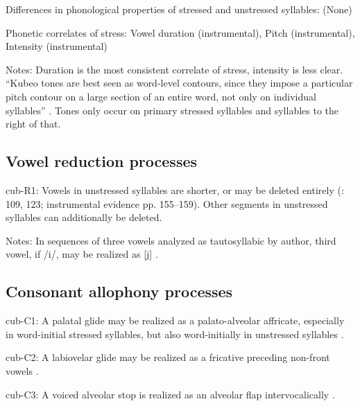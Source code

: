 {\begin{appendixdesc}
\item[Differences in phonological properties of stressed and unstressed syllables:] (None)

\item[Phonetic correlates of stress:] Vowel duration (instrumental), Pitch (instrumental), Intensity (instrumental)

\item[Notes:] Duration is the most consistent correlate of stress, intensity is less clear. ``Kubeo tones are best seen as word-level contours, since they impose a particular pitch contour on a large section of an entire word, not only on individual syllables'' \citep[134]{Chacon2012}. Tones only occur on primary stressed syllables and syllables to the right of that.
\end{appendixdesc}
\subsection*{Vowel reduction processes}
\begin{appendixdesc}

\item[cub-R1:] Vowels in unstressed syllables are shorter, or may be deleted entirely (\citealt{Chacon2012}: 109, 123; instrumental evidence pp. 155--159). Other segments in unstressed syllables can additionally be deleted.

\item[Notes:] In sequences of three vowels analyzed as tautosyllabic by author, third vowel, if /i/, may be realized as [j] \citep[52]{Chacon2012}.
\end{appendixdesc}
\subsection*{Consonant allophony processes}
\begin{appendixdesc}

\item[cub-C1:] A palatal glide may be realized as a palato-alveolar affricate, especially in word-initial stressed syllables, but also word-initially in unstressed syllables \citep[67]{Chacon2012}.

\item[cub-C2:] A labiovelar glide may be realized as a fricative preceding non-front vowels \citep[63]{Chacon2012}.

\item[cub-C3:] A voiced alveolar stop is realized as an alveolar flap intervocalically \citep[63]{Chacon2012}.


\end{appendixdesc}}
